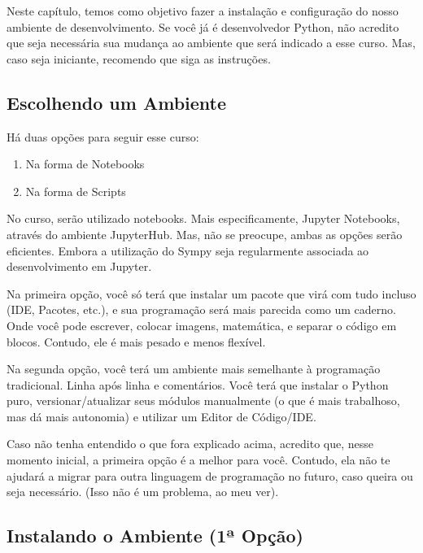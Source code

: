 \documentclass[a4paper, 11pt, brazilian]{article}
\providecommand{\tightlist}{%
      \setlength{\itemsep}{0pt}\setlength{\parskip}{0pt}}
\begin{document}
Neste capítulo, temos como objetivo fazer a instalação e configuração do
nosso ambiente de desenvolvimento. Se você já é desenvolvedor Python,
não acredito que seja necessária sua mudança ao ambiente que será
indicado a esse curso. Mas, caso seja iniciante, recomendo que siga as
instruções.

\hypertarget{escolhendo-um-ambiente}{%
\subsection{Escolhendo um Ambiente}\label{escolhendo-um-ambiente}}

Há duas opções para seguir esse curso:

\begin{enumerate}
\def\labelenumi{\arabic{enumi}.}
\tightlist
\item
  Na forma de Notebooks
\item
  Na forma de Scripts
\end{enumerate}

No curso, serão utilizado notebooks. Mais especificamente, Jupyter
Notebooks, através do ambiente JupyterHub. Mas, não se preocupe, ambas
as opções serão eficientes. Embora a utilização do Sympy seja
regularmente associada ao desenvolvimento em Jupyter.

Na primeira opção, você só terá que instalar um pacote que virá com tudo
incluso (IDE, Pacotes, etc.), e sua programação será mais parecida como
um caderno. Onde você pode escrever, colocar imagens, matemática, e
separar o código em blocos. Contudo, ele é mais pesado e menos flexível.

Na segunda opção, você terá um ambiente mais semelhante à programação
tradicional. Linha após linha e comentários. Você terá que instalar o
Python puro, versionar/atualizar seus módulos manualmente (o que é mais
trabalhoso, mas dá mais autonomia) e utilizar um Editor de Código/IDE.

Caso não tenha entendido o que fora explicado acima, acredito que, nesse
momento inicial, a primeira opção é a melhor para você. Contudo, ela não
te ajudará a migrar para outra linguagem de programação no futuro, caso
queira ou seja necessário. (Isso não é um problema, ao meu ver).

\hypertarget{instalando-o-ambiente-1uxaa-opuxe7uxe3o}{%
\subsection{Instalando o Ambiente (1ª
Opção)}\label{instalando-o-ambiente-1uxaa-opuxe7uxe3o}}
\end{document}
